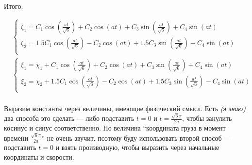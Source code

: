 Итого:

\begin{align*}
     & \begin{cases}
        \zeta_1 = C_1 \cos\left( \frac{at}{\sqrt{6}} \right) + C_2\cos(at) + C_3 \sin\left( \frac{at}{\sqrt{6}} \right) + C_4 \sin(at)         \\
        \zeta_2 = 1.5 C_1 \cos\left( \frac{at}{\sqrt{6}} \right) - C_2\cos(at) + 1.5 C_3 \sin\left( \frac{at}{\sqrt{6}} \right) - C_4 \sin(at) \\
    \end{cases} \\
     & \begin{cases}
        \xi_1 = \chi_1 + C_1 \cos\left( \frac{at}{\sqrt{6}} \right) + C_2\cos(at) + C_3 \sin\left( \frac{at}{\sqrt{6}} \right) + C_4 \sin(at)         \\
        \xi_2 = \chi_2 + 1.5 C_1 \cos\left( \frac{at}{\sqrt{6}} \right) - C_2\cos(at) + 1.5 C_3 \sin\left( \frac{at}{\sqrt{6}} \right) - C_4 \sin(at) \\
    \end{cases} \\
\end{align*}

Выразим константы через величины, имеющие физический смысл. Есть \textit{(я знаю)} два способа это сделать --- либо подставить \(t = 0\) и \(t = \frac{\sqrt{6}\pi}{2a}\), чтобы занулить косинус и синус соответственно. Но величина ``координата груза в момент времени \(\frac{\sqrt{6}\pi}{2a}\)'' не очень звучит, поэтому буду использовать второй способ --- подставить \(t = 0\) и взять производную, чтобы выразить через начальные координаты и скорости.

